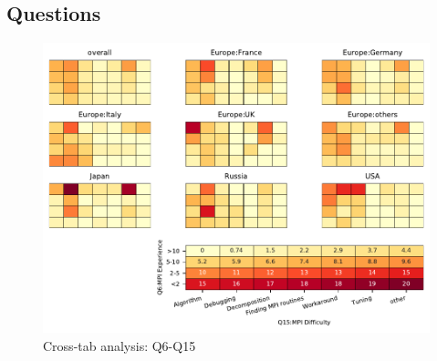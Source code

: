 
\subsection{Questions}


\begin{figure}
\begin{center}
\includegraphics[width=12cm]{../pdfs/Q6-Q15.pdf}
\caption{Cross-tab analysis: Q6-Q15}
\label{fig:Q6-Q15}
\end{center}
\end{figure}

